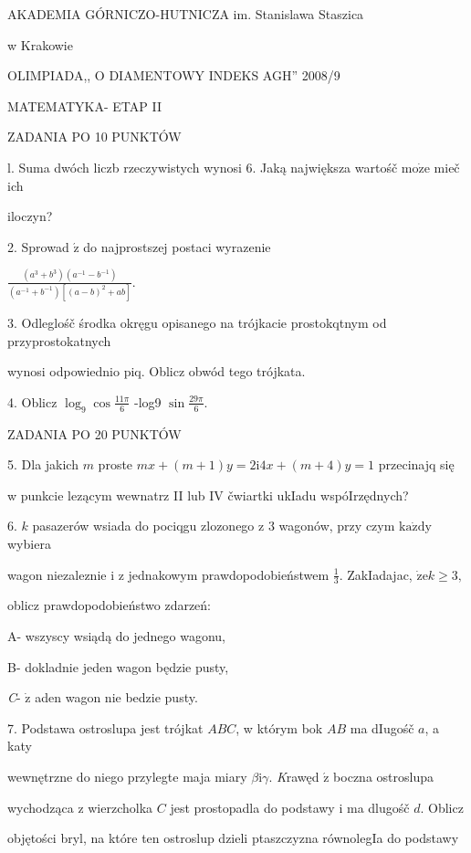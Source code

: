 \documentclass[a4paper,12pt]{article}
\begin{document}
AKADEMIA GÓRNICZO-HUTNICZA im. Stanislawa Staszica

w Krakowie

OLIMPIADA,, O DIAMENTOWY INDEKS AGH'' 2008/9

MATEMATYKA- ETAP II

ZADANIA PO 10 PUNKTÓW

l. Suma dwóch liczb rzeczywistych wynosi 6. Jaką największa wartośč $\mathrm{m}\mathrm{o}\dot{\mathrm{z}}\mathrm{e}$ mieč ich

iloczyn?

2. Sprowad $\acute{\mathrm{z}}$ do najprostszej postaci wyrazenie

$\displaystyle \frac{(a^{3}+b^{3})(a^{-1}-b^{-1})}{(a^{-1}+b^{-1})[(a-b)^{2}+ab]}.$

3. Odleglośč środka okręgu opisanego na trójkacie prostokqtnym od przyprostokatnych

wynosi odpowiednio piq. Oblicz obwód tego trójkata.

4. Oblicz $\displaystyle \log_{9}\cos\frac{11\pi}{6}$ -log9 $\displaystyle \sin\frac{29\pi}{6}.$

ZADANIA PO 20 PUNKTÓW

5. Dla jakich $m$ proste $mx+(m+1)y = 2 \mathrm{i} 4x+(m+4)y = 1$ przecinajq się

w punkcie lezącym wewnatrz II lub IV čwiartki ukIadu wspóIrzędnych?

6. $k$ pasazerów wsiada do pociqgu zlozonego z 3 wagonów, przy czym $\mathrm{k}\mathrm{a}\dot{\mathrm{z}}\mathrm{d}\mathrm{y}$ wybiera

wagon niezaleznie i z jednakowym prawdopodobieństwem $\displaystyle \frac{1}{3}$. ZakIadajac, $\dot{\mathrm{z}}\mathrm{e}k\geq 3,$

oblicz prawdopodobieństwo zdarzeń:

A- wszyscy wsiądą do jednego wagonu,

B- dokladnie jeden wagon będzie pusty,

{\it C}- $\dot{\mathrm{z}}$ aden wagon nie bedzie pusty.

7. Podstawa ostroslupa jest trójkat $ABC$, w którym bok $AB$ ma dIugośč $a$, a katy

wewnętrzne do niego przylegte maja miary $\beta \mathrm{i} \gamma.$ {\it K}rawęd $\acute{\mathrm{z}}$ boczna ostroslupa

wychodząca z wierzcholka $C$ jest prostopadla do podstawy i ma dlugośč $d$. Oblicz

objętości bryl, na które ten ostroslup dzieli ptaszczyzna równolegIa do podstawy
\end{document}
